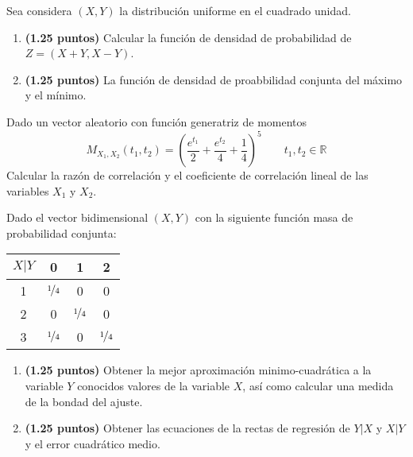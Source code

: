 \documentclass[12pt]{article}
\begin{document}
    \begin{ejercicio}
        Sea considera $(X,Y)$ la distribución uniforme en el cuadrado unidad.
        \begin{enumerate}[label=\alph*)]
            \item \textbf{(1.25 puntos)} Calcular la función de densidad de probabilidad de $Z = (X+Y,X-Y)$.
            \item \textbf{(1.25 puntos)} La función de densidad de proabbilidad conjunta del máximo y el mínimo.
        \end{enumerate}
    \end{ejercicio}

    \begin{ejercicio}
        Dado un vector aleatorio con función generatriz de momentos
        \begin{equation*}
            M_{X_1,X_2}(t_1,t_2) = {\left(\dfrac{e^{t_1}}{2}+\dfrac{e^{t_2}}{4}+\dfrac{1}{4}\right)}^{5} \qquad t_1,t_2 \in \mathbb{R}
        \end{equation*}
        Calcular la razón de correlación y el coeficiente de correlación lineal de las variables $X_1$ y $X_2$.
    \end{ejercicio}

    \begin{ejercicio}
        Dado el vector bidimensional $(X,Y)$ con la siguiente función masa de probabilidad conjunta:
        \begin{table}[H]
        \centering
        \begin{tabular}{|c|ccc|}
            \hline
            $X|Y$ & 0 & 1 & 2 \\
            \hline
            1 & $\nicefrac{1}{4}$ & 0 & 0 \\
            2 & 0 & $\nicefrac{1}{4}$ & 0 \\
            3 & $\nicefrac{1}{4}$ & 0 & $\nicefrac{1}{4}$ \\
            \hline
        \end{tabular}
        \end{table}
        \begin{enumerate}[label=\alph*)]
            \item \textbf{(1.25 puntos)} Obtener la mejor aproximación minimo-cuadrática a la variable $Y$ conocidos valores de la variable $X$, así como calcular una medida de la bondad del ajuste.
            \item \textbf{(1.25 puntos)} Obtener las ecuaciones de la rectas de regresión de $Y|X$ y $X|Y$ y el error cuadrático medio.
        \end{enumerate}
    \end{ejercicio}
\end{document}
